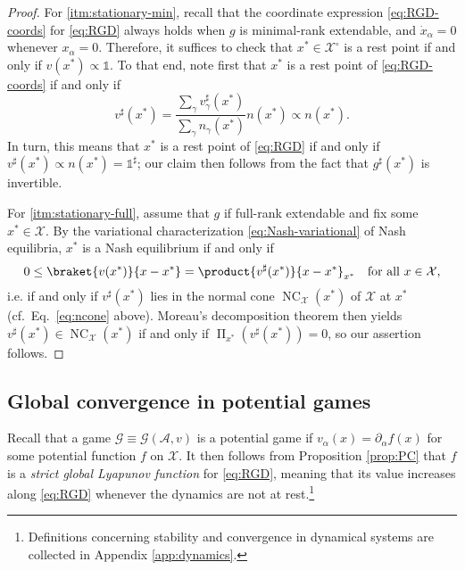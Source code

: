 \documentclass[reqno]{amsart}
\theoremstyle{plain}
\theoremstyle{definition}
\theoremstyle{remark}
\numberwithin{equation}{section}
\numberwithin{theorem}{section}
\begin{document}
\begin{proof}
For \eqref{itm:stationary-min}, recall that the coordinate expression \eqref{eq:RGD-coords} for \eqref{eq:RGD} always holds when $g$ is minimal-rank extendable, and $\dot x_{\alpha} = 0$ whenever $x_{\alpha} = 0$.
Therefore, it suffices to check that ${x^{\ast}}\in{{\mathcal{X}}^{\circ}}$ is a rest point if and only if ${v}({x^{\ast}}) \propto {\mathds{1}}$.
To that end, note first that ${x^{\ast}}$ is a rest point of \eqref{eq:RGD-coords} if and only if 
\begin{equation}
\label{eq:pfofrs}
{v}^{\sharp}({x^{\ast}})
	= \frac{{\sum\nolimits}_{\gamma} {v}^{\sharp}_{\gamma}({x^{\ast}})}{{\sum\nolimits}_{\gamma} {n}_{\gamma}({x^{\ast}})} {n}({x^{\ast}})
	\propto {n}({x^{\ast}}).
\end{equation}
In turn, this means that ${x^{\ast}}$ is a rest point of \eqref{eq:RGD} if and only if ${v}^{\sharp}({x^{\ast}}) \propto {n}({x^{\ast}}) = {\mathds{1}}^{\sharp}$;
our claim then follows from the fact that $g^{\sharp}({x^{\ast}})$ is invertible.

For \eqref{itm:stationary-full}, assume that $g$ if full-rank extendable and fix some ${x^{\ast}}\in{\mathcal{X}}$.
By the variational characterization \eqref{eq:Nash-variational} of Nash equilibria, ${x^{\ast}}$ is a Nash equilibrium if and only if
\begin{equation}
0	\leq
	\braket{{v}({x^{\ast}})}{x - {x^{\ast}}}
	= \product{{v}^{\sharp}({x^{\ast}})}{x-{x^{\ast}}}_{x^{\ast}}
	\quad
	\text{for all $x\in{\mathcal{X}}$},
\end{equation}
i.e. if and only if ${v}^{\sharp}({x^{\ast}})$ lies in the normal cone $\operatorname{NC}_{\mathcal{X}}({x^{\ast}})$ of ${\mathcal{X}}$ at ${x^{\ast}}$ (cf.~Eq.~\ref{eq:ncone} above).
Moreau's decomposition theorem then yields ${v}^{\sharp}({x^{\ast}}) \in \operatorname{NC}_{\mathcal{X}}({x^{\ast}})$ if and only if $\operatorname{\Pi}_{x^{\ast}}({v}^{\sharp}({x^{\ast}})) = 0$, so our assertion follows.
\end{proof}

\subsection{Global convergence in potential games}
\label{sec:GCPG}

Recall that a game ${\mathcal{G}}\equiv{{\mathcal{G}}({\mathcal{A}},{v})}$ is a potential game if ${v}_{\alpha}(x) = {\partial}_{\alpha}{f}(x)$ for some potential function ${f}$ on ${\mathcal{X}}$.
It then follows from Proposition \ref{prop:PC} that $f$ is a \emph{strict global Lyapunov function} for \eqref{eq:RGD}, meaning that its value increases along \eqref{eq:RGD} whenever the dynamics are not at rest.\footnote{Definitions concerning stability and convergence in dynamical systems are collected in Appendix \ref{app:dynamics}.}
\end{document}
